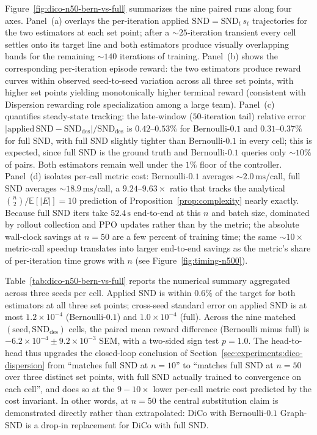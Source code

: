 \documentclass{article}
\theoremstyle{plain}
\theoremstyle{definition}
\theoremstyle{remark}
\newcommand{\SND}{\ensuremath{\mathrm{SND}}}
\begin{document}
Figure~\ref{fig:dico-n50-bern-vs-full} summarizes the nine paired
runs along four axes. Panel~(a) overlays the per-iteration applied
$\SND{=}\SND_t\,s_t$ trajectories for the two estimators at each set
point; after a ${\sim}25$-iteration transient every cell settles
onto its target line and both estimators produce visually
overlapping bands for the remaining ${\sim}140$ iterations of
training. Panel~(b) shows the corresponding per-iteration episode
reward: the two estimators produce reward curves within observed
seed-to-seed variation across all three set points, with higher set points
yielding monotonically higher terminal reward (consistent with
Dispersion rewarding role specialization among a large team).
Panel~(c) quantifies steady-state tracking: the late-window
($50$-iteration tail) relative error
$|\mathrm{applied}\,\SND - \SND_{\mathrm{des}}|/\SND_{\mathrm{des}}$
is $0.42$--$0.53\%$ for Bernoulli-$0.1$ and $0.31$--$0.37\%$ for
full SND, with full SND slightly tighter than Bernoulli-$0.1$ in
every cell; this is expected, since full SND is the ground truth and
Bernoulli-$0.1$ queries only ${\sim}10\%$ of pairs. Both estimators
remain well under the $1\%$ floor of the controller. Panel~(d)
isolates per-call metric cost: Bernoulli-$0.1$ averages
${\sim}2.0\,\mathrm{ms}$/call, full SND averages
${\sim}18.9\,\mathrm{ms}$/call, a $9.24$--$9.63\times$ ratio that
tracks the analytical $\binom{n}{2}/\mathbb{E}[|E|]{=}10$ prediction
of Proposition~\ref{prop:complexity} nearly exactly. Because full
SND iters take $52.4\,\mathrm{s}$ end-to-end at this $n$ and batch
size, dominated by rollout collection and PPO updates rather than
by the metric; the absolute wall-clock savings at $n{=}50$ are a
few percent of training time; the same ${\sim}10{\times}$
metric-call speedup translates into larger end-to-end savings as the
metric's share of per-iteration time grows with $n$ (see
Figure~\ref{fig:timing-n500}).

Table~\ref{tab:dico-n50-bern-vs-full} reports the numerical summary
aggregated across three seeds per cell. Applied $\SND$ is within
$0.6\%$ of the target for both estimators at all three set points;
cross-seed standard error on applied $\SND$ is at most
$1.2\times 10^{-4}$ (Bernoulli-$0.1$) and $1.0\times 10^{-4}$
(full). Across the nine matched $(\mathrm{seed},\SND_{\mathrm{des}})$
cells, the paired mean reward difference (Bernoulli minus full) is
$-6.2{\times}10^{-4}\pm9.2{\times}10^{-3}$ SEM, with a two-sided sign
test $p{=}1.0$. The head-to-head
thus upgrades the closed-loop conclusion of
Section~\ref{sec:experiments:dico-dispersion} from ``matches full
$\SND$ at $n{=}10$'' to ``matches full $\SND$ at $n{=}50$ over three
distinct set points, with full SND actually trained to convergence
on each cell'', and does so at the $9{-}10\times$ lower per-call
metric cost predicted by the cost invariant. In other words, at
$n{=}50$ the central substitution claim is demonstrated directly
rather than extrapolated: DiCo with Bernoulli-$0.1$ Graph-SND is a
drop-in replacement for DiCo with full SND.
\end{document}
